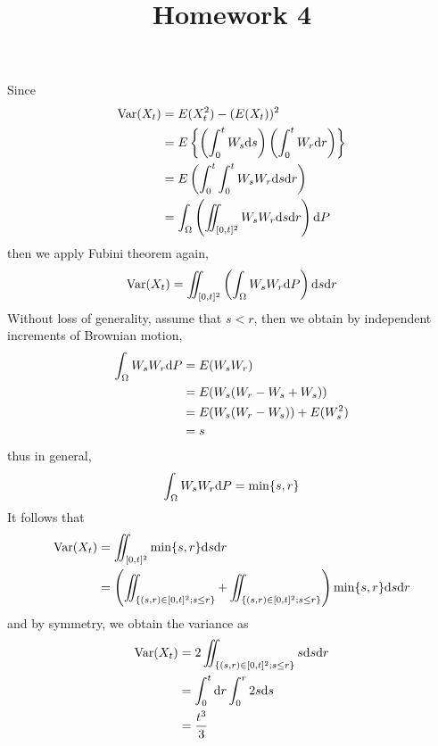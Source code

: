 \documentclass{homework}
\title{Homework 4}
\DeclareMathOperator{\var}{Var}
\begin{document}
    \maketitle

    \problem
    Since
    \[\begin{aligned}
        \var(X_t)&=E(X_t^2)-(E(X_t))^2\\
        &=E\left\{\left(\int_0^tW_s\diff s\right)
        \left(\int_0^tW_r\diff r\right)\right\}\\
        &=E\left(\int_0^t\int_0^tW_sW_r\diff s\diff r\right)\\
        &=\int_\Omega\left(\iint_{[0,t]^2}W_sW_r\diff s\diff r\right)\diff P
    \end{aligned}\]
    then we apply Fubini theorem again,
    \[\var(X_t)=\iint_{[0,t]^2}
    \left(\int_\Omega W_sW_r\diff P\right)\diff s\diff r\]
    Without loss of generality, assume that $s<r$, then we obtain
    by independent increments of Brownian motion,
    \[\begin{aligned}
        \int_\Omega W_sW_r\mathrm d P&=E(W_sW_r)\\
        &=E(W_s(W_r-W_s+W_s))\\
        &=E(W_s(W_r-W_s))+E(W_s^2)\\
        &=s
    \end{aligned}\]
    thus in general,
    \[\int_\Omega W_sW_r\mathrm d P=\min\{s,r\}\]
    It follows that
    \[\begin{aligned}
        \var(X_t)&=\iint_{[0,t]^2}\min\{s,r\}\diff s\diff r\\
        &=\left(\iint_{\{(s,r)\in[0,t]^2;s\leq r\}}
                +\iint_{\{(s,r)\in[0,t]^2;s\leq r\}}\right)
        \min\{s,r\}\diff s\diff r\\
    \end{aligned}\]
    and by symmetry, we obtain the variance as
    \[\begin{aligned}
        \var(X_t)&=2\iint_{\{(s,r)\in[0,t]^2;s\leq r\}}s\diff s\diff r\\
        &=\int_0^t\diff r\int_0^r2s\diff s\\
        &=\frac{t^3}{3}
    \end{aligned}\]

    \problem
\end{document}

